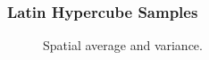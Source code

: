\documentclass[9pt]{beamer}
\begin{document}
\begin{frame}
\frametitle{Latin Hypercube Samples}
\label{sec-2-10}

\vspace*{-0.0cm}\begin{figure}
      \caption{Spatial average and variance.}
\end{figure}
\end{frame}
\end{document}
